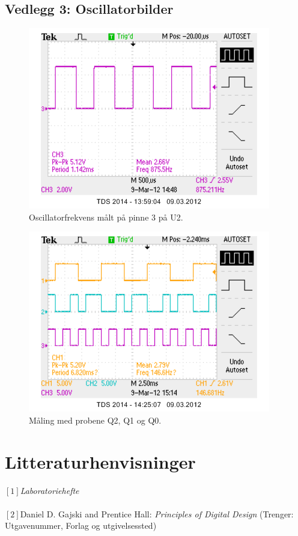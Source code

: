\documentclass[12pt,norsk,a4paper]{article}
\begin{document}
    \subsection{Vedlegg 3: Oscillatorbilder}
    \begin{figure}[H]
    \begin{center}
    \includegraphics[scale=1.0]{Fig1.png}
    \caption{Oscillatorfrekvens målt på pinne 3 på U2.}
    \end{center}
    \label{fig:Oscillatorbilde1}
    \end{figure}

    \begin{figure}[H]
    \begin{center}
    \includegraphics[scale=1.0]{Fig2.png}
    \caption{Måling med probene Q2, Q1 og Q0.}
    \end{center}
    \label{fig:Oscillatorbilde2}
    \end{figure}


\clearpage

\section{Litteraturhenvisninger}
$[1]$\textit{Laboratoriehefte} \\
\\
$[2]$Daniel D. Gajski and Prentice Hall: \textit{Principles of Digital Design} (Trenger: Utgavenummer, Forlag og utgivelsessted) \\ %
\\
\end{document}
